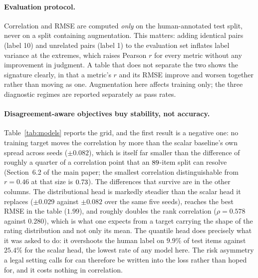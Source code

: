 \documentclass[11pt]{article}
\begin{document}
\paragraph{Evaluation protocol.} Correlation and RMSE are computed \emph{only}
on the human-annotated test split, never on a split containing augmentation.
This matters: adding identical pairs (label 10) and unrelated pairs (label 1) to
the evaluation set inflates label variance at the extremes, which raises Pearson
$r$ for every metric without any improvement in judgment. A table that does not
separate the two shows the signature clearly, in that a metric's $r$ and its
RMSE improve and worsen together rather than moving as one. Augmentation here
affects training only; the three diagnostic regimes are reported separately as
pass rates.

\begin{table}[t]\centering\small

\caption{Trained metrics, mean over 5 seeds, evaluated on the human-annotated
test split only. \emph{ident.}\ and \emph{unrel.}\ are the two sanity checks in
current use; \textsc{LegalEdit} false-acceptance is the share of legally flipped
pairs still scored $\geq 7$ (``accurate'' under the published rubric). The
margin is the quantity defined in Section~3 of the main paper. It is shown as `--'
where a model places the identical and unrelated probes within one point of
each other, because a model with no working range has none to spend on the
edit.}
\label{tab:models}
\end{table}

\paragraph{Disagreement-aware objectives buy stability, not accuracy.}
Table~\ref{tab:models} reports the grid, and the first result is a negative one:
no training target moves the correlation by more than the scalar baseline's own
spread across seeds ($\pm0.082$), which is itself far smaller than the
difference of roughly a quarter of a correlation point that an $89$-item
split can resolve (Section~6.2 of the main paper; the smallest correlation
distinguishable from $r=0.46$ at that size is $0.73$). The differences that survive are in the other columns. The
distributional head is markedly steadier than the scalar head it replaces
($\pm0.029$ against $\pm0.082$ over the same five seeds), reaches the best RMSE
in the table ($1.99$), and roughly doubles the rank correlation ($\rho=0.578$
against $0.280$), which is what one expects from a target carrying the shape of
the rating distribution and not only its mean. The quantile head does precisely
what it was asked to do: it overshoots the human label on $9.9\%$ of test items
against $25.4\%$ for the scalar head, the lowest rate of any model here. The
risk asymmetry a legal setting calls for can therefore be written into the loss
rather than hoped for, and it costs nothing in correlation.
\end{document}
